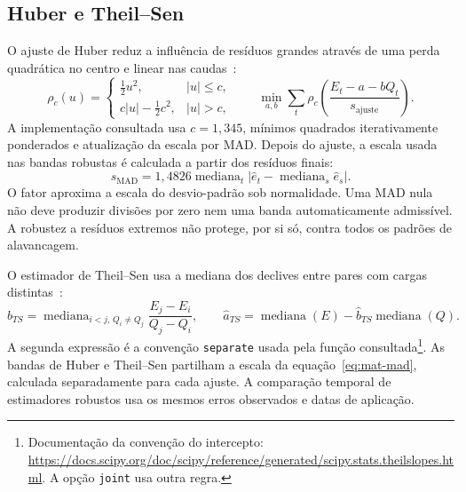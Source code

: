 \subsection{Huber e Theil--Sen}
\label{sec:mat-robustos}
O ajuste de Huber reduz a influência de resíduos grandes através de uma perda quadrática no centro e linear nas caudas~\parencite{Huber1964,HollandWelsch1977}:
\begin{equation}
\rho_c(u)=\begin{cases}\tfrac12u^2,&|u|\leq c,\\c|u|-\tfrac12c^2,&|u|>c,\end{cases}
\qquad \min_{a,b}\sum_t\rho_c\!\left(\frac{E_t-a-bQ_t}{s_{\mathrm{ajuste}}}\right).
\label{eq:mat-huber}
\end{equation}
A implementação consultada usa $c=1{,}345$, mínimos quadrados iterativamente ponderados e atualização da escala por MAD. Depois do ajuste, a escala usada nas bandas robustas é calculada a partir dos resíduos finais:
\begin{equation}
s_{\mathrm{MAD}}=1{,}4826\operatorname{mediana}_t
\left|\widehat e_t-\operatorname{mediana}_s\widehat e_s\right|.
\label{eq:mat-mad}
\end{equation}
O fator aproxima a escala do desvio-padrão sob normalidade. Uma MAD nula não deve produzir divisões por zero nem uma banda automaticamente admissível. A robustez a resíduos extremos não protege, por si só, contra todos os padrões de alavancagem.

O estimador de Theil--Sen usa a mediana dos declives entre pares com cargas distintas~\parencite{Sen1968}:
\begin{equation}
\widehat b_{TS}=\operatorname{mediana}_{i<j,\,Q_i\neq Q_j}
\frac{E_j-E_i}{Q_j-Q_i},
\qquad
\widehat a_{TS}=\operatorname{mediana}(E)-\widehat b_{TS}\operatorname{mediana}(Q).
\label{eq:mat-theil-sen}
\end{equation}
A segunda expressão é a convenção \texttt{separate} usada pela função consultada\footnote{Documentação da convenção do intercepto: \url{https://docs.scipy.org/doc/scipy/reference/generated/scipy.stats.theilslopes.html}. A opção \texttt{joint} usa outra regra.}. As bandas de Huber e Theil--Sen partilham a escala da equação~\ref{eq:mat-mad}, calculada separadamente para cada ajuste. A comparação temporal de estimadores robustos usa os mesmos erros observados e datas de aplicação.

